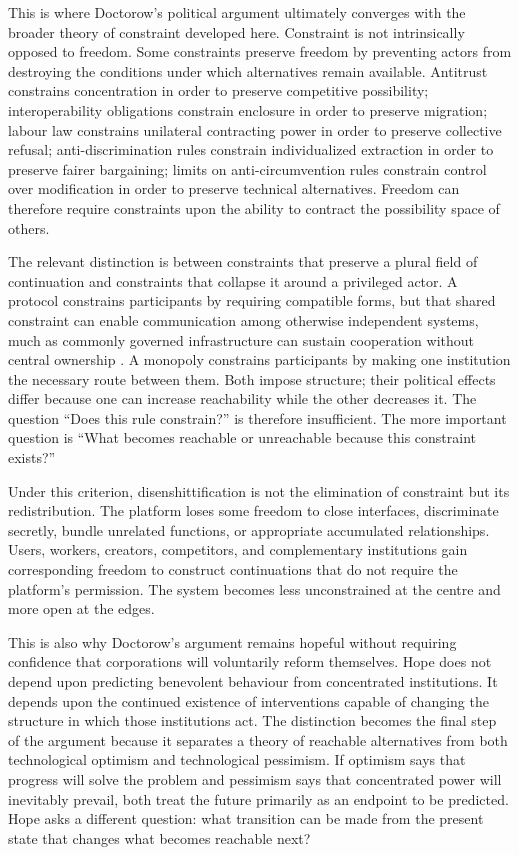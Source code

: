 \documentclass[11pt]{article}
\begin{document}
This is where Doctorow's political argument ultimately converges with the broader theory of constraint developed here. Constraint is not intrinsically opposed to freedom. Some constraints preserve freedom by preventing actors from destroying the conditions under which alternatives remain available. Antitrust constrains concentration in order to preserve competitive possibility; interoperability obligations constrain enclosure in order to preserve migration; labour law constrains unilateral contracting power in order to preserve collective refusal; anti-discrimination rules constrain individualized extraction in order to preserve fairer bargaining; limits on anti-circumvention rules constrain control over modification in order to preserve technical alternatives. Freedom can therefore require constraints upon the ability to contract the possibility space of others.

The relevant distinction is between constraints that preserve a plural field of continuation and constraints that collapse it around a privileged actor. A protocol constrains participants by requiring compatible forms, but that shared constraint can enable communication among otherwise independent systems, much as commonly governed infrastructure can sustain cooperation without central ownership \parencite{ostrom1990governing}. A monopoly constrains participants by making one institution the necessary route between them. Both impose structure; their political effects differ because one can increase reachability while the other decreases it. The question ``Does this rule constrain?'' is therefore insufficient. The more important question is ``What becomes reachable or unreachable because this constraint exists?''

Under this criterion, disenshittification is not the elimination of constraint but its redistribution. The platform loses some freedom to close interfaces, discriminate secretly, bundle unrelated functions, or appropriate accumulated relationships. Users, workers, creators, competitors, and complementary institutions gain corresponding freedom to construct continuations that do not require the platform's permission. The system becomes less unconstrained at the centre and more open at the edges.

This is also why Doctorow's argument remains hopeful without requiring confidence that corporations will voluntarily reform themselves. Hope does not depend upon predicting benevolent behaviour from concentrated institutions. It depends upon the continued existence of interventions capable of changing the structure in which those institutions act. The distinction becomes the final step of the argument because it separates a theory of reachable alternatives from both technological optimism and technological pessimism. If optimism says that progress will solve the problem and pessimism says that concentrated power will inevitably prevail, both treat the future primarily as an endpoint to be predicted. Hope asks a different question: what transition can be made from the present state that changes what becomes reachable next?
\end{document}
